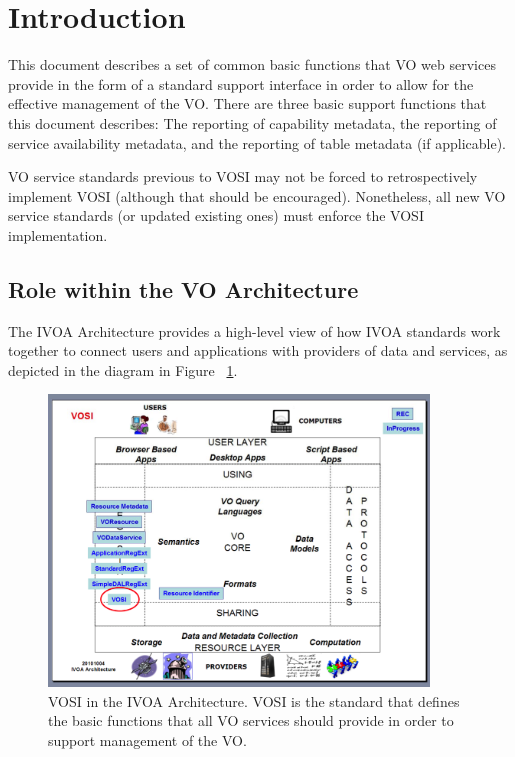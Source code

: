 \documentclass[11pt,letter]{ivoa}
\begin{document}
\section{Introduction}
\label{sec:introduction}

This document describes a set of common basic functions that VO web services provide in the form of a standard support interface in order to allow for the effective management of the VO.  There are three basic support functions that this document describes:  The reporting of capability metadata, the reporting of service availability metadata, and the reporting of table metadata (if applicable).

VO service standards previous to VOSI may not be forced to retrospectively implement VOSI (although that should be encouraged). Nonetheless, all new VO service standards (or updated existing ones) must enforce the VOSI implementation.


\subsection{Role within the VO Architecture}

The IVOA Architecture \citep{note:VOARCH} provides a high-level view of how IVOA standards work together to connect users and applications with providers of data and services, as depicted in the diagram in Figure ~\ref{fig:archdiag}. 

\begin{figure}
\centering


\includegraphics[width=0.9\textwidth]{archdiag.png}
\caption{VOSI in the IVOA Architecture. VOSI is the standard that defines the basic functions that all VO services should provide in order to support management of the VO.}
\label{fig:archdiag}
\end{figure}
\end{document}
